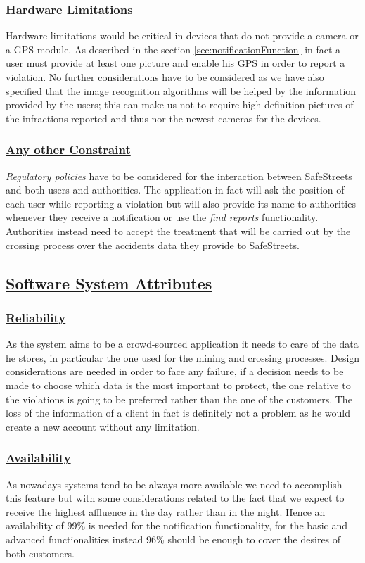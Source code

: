 		\subsubsection[Hardware Limitations]{\hyperlink{toc}{Hardware Limitations}}
			Hardware limitations would be critical in devices that do not provide a camera or a GPS module. As described in the section \ref{sec:notificationFunction} in fact a user must provide at least one picture and enable his GPS in order to report a violation. No further considerations have to be considered as we have also specified that the image recognition algorithms will be helped by the information provided by the users; this can make us not to require high definition pictures of the infractions reported and thus nor the newest cameras for the devices.
		\subsubsection[Any other Constraint]{\hyperlink{toc}{Any other Constraint}}
			\emph{Regulatory policies}  have to be considered for the interaction between SafeStreets and both users and authorities. The application in fact will ask the position of each user while reporting a violation but will also provide its name to authorities whenever they receive a notification or use the \emph{find reports} functionality.
			Authorities instead need to accept the treatment that will be carried out by the crossing process over the accidents data they provide to SafeStreets.
	
	\subsection[Software System Attributes]{\hyperlink{toc}{Software System Attributes}}
		\subsubsection[Reliability]{\hyperlink{toc}{Reliability}}
			As the system aims to be a crowd-sourced application it needs to care of the data he stores, in particular the one used for the mining and crossing processes. Design considerations are needed in order to face any failure, if a decision needs to be made to choose which data is the most important to protect, the one relative to the violations is going to be preferred rather than the one of the customers. The loss of the information of a client in fact is definitely not a problem as he would create a new account without any limitation.
		\subsubsection[Availability]{\hyperlink{toc}{Availability}}
			As nowadays systems tend to be always more available we need to accomplish this feature but with some considerations related to the fact that we expect to receive the highest affluence in the day rather than in the night. Hence an availability of 99\% is needed for the notification functionality, for the basic and advanced functionalities instead 96\% should be enough to cover the desires of both customers.
